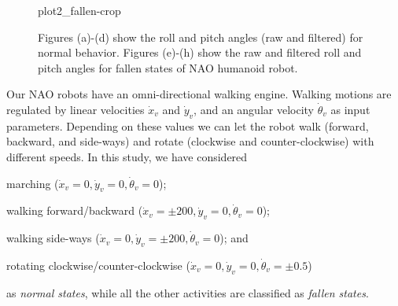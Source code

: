 \documentclass[letterpaper]{article}
\begin{document}
\begin{sloppy}
\begin{figure}[!ht]
{       {plot2_fallen-crop}}
  \caption{Figures (a)-(d) show the roll and pitch angles (raw and filtered) for normal 
behavior. Figures (e)-(h) show the raw and filtered roll and pitch angles for fallen 
states of NAO humanoid robot.}
  \label{fig:normalFallenBehavior}

\end{figure}


Our NAO robots have an omni-directional walking engine.  
Walking motions are regulated by linear velocities $\dot{x}_v$ and $\dot{y}_v$, and an 
angular velocity $\dot{\theta}_v$ as input parameters. Depending on these
values we can let the robot walk (forward, backward, and side-ways) and rotate (clockwise and
counter-clockwise) with different speeds. In this study, we have considered \begin{inparaenum}[(1)]
\item marching ($\dot{x}_v = 0 , \dot{y}_v = 0, \dot{\theta}_v = 0$); \item walking  
forward/backward ($\dot{x}_v = \pm200
, \dot{y}_v = 0, \dot{\theta}_v = 0$);  \item walking side-ways ($\dot{x}_v = 0, \dot{y}_v = 
\pm200, \dot{\theta}_v = 0$); and  \item rotating clockwise/counter-clockwise
($\dot{x}_v = 0 , \dot{y}_v = 0, \dot{\theta}_v = \pm 0.5$) \end{inparaenum} as {\em normal states}, 
while all the other activities are classified as {\em fallen states}. 


\end{sloppy}
\end{document}
